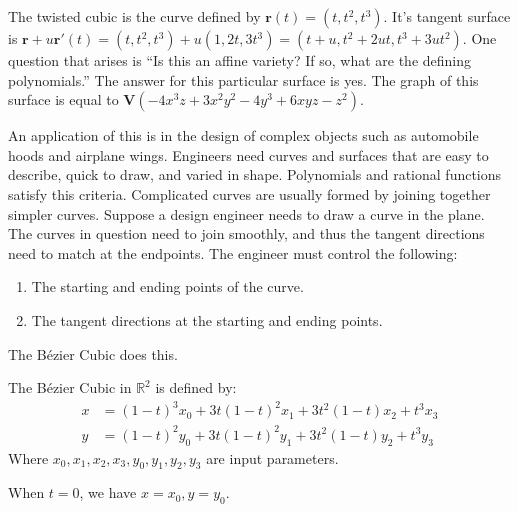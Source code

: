 \documentclass[crop=false,class=article,oneside]{standalone}
\begin{document}
            \begin{example}
                The twisted cubic is the curve defined by
                $\mathbf{r}(t)=(t,t^2,t^3)$. It's tangent surface is
                $\mathbf{r}+u\mathbf{r}'(t)%
                 =(t,t^2,t^3)+u(1,2t,3t^3)%
                 =(t+u,t^2+2ut,t^3+3ut^2)$.
                One question that arises is
                ``Is this an affine variety? If so,
                what are the defining polynomials.''
                The answer for this particular surface is yes.
                The graph of this surface is equal to
                $\mathbf{V}(-4x^3z+3x^2y^2-4y^3+6xyz-z^2)$.
            \end{example}
            An application of this is in the design of
            complex objects such as automobile hoods and
            airplane wings. Engineers need curves and surfaces
            that are easy to describe, quick to draw, and varied
            in shape. Polynomials and rational functions satisfy
            this criteria. Complicated curves are usually
            formed by joining together simpler curves. Suppose
            a design engineer needs to draw a curve in the plane.
            The curves in question need to join smoothly, and
            thus the tangent directions need to match at the
            endpoints. The engineer must control the following:
            \begin{enumerate}
                \item The starting and ending
                      points of the curve.
                \item The tangent directions
                      at the starting and ending points.
            \end{enumerate}
            The B\'{e}zier Cubic does this.
            \begin{definition}
                The B\'{e}zier Cubic in $\mathbb{R}^2$
                is defined by:
                \begin{align*}
                    x&=(1-t)^{3}x_0
                      +3t(1-t)^2x_1
                      +3t^2(1-t)x_2+t^3x_3\\
                    y&=(1-t)^{2}y_0
                      +3t(1-t)^2y_1
                      +3t^2(1-t)y_2+t^3y_3
                \end{align*}
                Where $x_0,x_1,x_2,x_3,y_0,y_1,y_2,y_3$
                are input parameters.
            \end{definition}
            When $t=0$, we have $x = x_0, y=y_0$.
\end{document}
